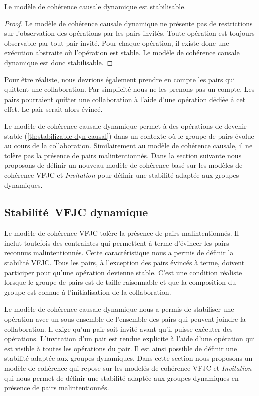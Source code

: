 \begin{theorem}\label{th:stabilizable-dyn-causal}
Le modèle de cohérence causale dynamique est stabilisable.
\end{theorem}

\begin{proof}
Le modèle de cohérence causale dynamique ne présente pas de restrictions sur l'observation des opérations par les pairs invités.
Toute opération est toujours observable par tout pair invité.
Pour chaque opération, il existe donc une exécution abstraite où l'opération est stable.
Le modèle de cohérence causale dynamique est donc stabilisable.
\end{proof}

Pour être réaliste, nous devrions également prendre en compte les pairs qui quittent une collaboration.
Par simplicité nous ne les prenons pas un compte.
Les pairs pourraient quitter une collaboration à l'aide d'une opération dédiée à cet effet.
Le pair serait alors évincé.

Le modèle de cohérence causale dynamique permet à des opérations de devenir stable (\autoref{th:stabilizable-dyn-causal}) dans un contexte où le groupe de pairs évolue au cours de la collaboration.
Similairement au modèle de cohérence causale, il ne tolère pas la présence de pairs malintentionnés.
Dans la section suivante nous proposons de définir un nouveau modèle de cohérence basé sur les modèles de cohérence \acs{VFJC} et \emph{Invitation} pour définir une stabilité adaptée aux groupes dynamiques.


\subsection{Stabilité~\acl{VFJC} dynamique}\label{subsec:dvfjcs}

Le modèle de cohérence \ac{VFJC} tolère la présence de pairs malintentionnés.
Il inclut toutefois des contraintes qui permettent à terme d'évincer les pairs reconnus malintentionnés.
Cette caractéristique nous a permis de définir la stabilité \ac{VFJC}.
Tous les pairs, à l'exception des pairs évincés à terme, doivent participer pour qu'une opération devienne stable.
C'est une condition réaliste lorsque le groupe de pairs est de taille raisonnable et que la composition du groupe est connue à l'initialisation de la collaboration.

Le modèle de cohérence causale dynamique nous a permis de stabiliser une opération avec un sous-ensemble de l'ensemble des pairs qui peuvent joindre la collaboration.
Il exige qu'un pair soit invité avant qu'il puisse exécuter des opérations.
L'invitation d'un pair est rendue explicite à l'aide d'une opération qui est visible à toutes les opérations du pair.
Il est ainsi possible de définir une stabilité adaptée aux groupes dynamiques.
Dans cette section nous proposons un modèle de cohérence qui repose sur les modelés de cohérence \acs{VFJC} et \emph{Invitation} qui nous permet de définir une stabilité adaptée aux groupes dynamiques en présence de pairs malintentionnés.

